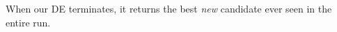 \documentclass[10pt,conference]{IEEEtran}
\theoremstyle{break}
\theoremstyle{break}
\begin{document}
 When our DE  terminates, it returns the best {\em new} candidate ever seen in the entire run.
 
 
 




\end{document}
